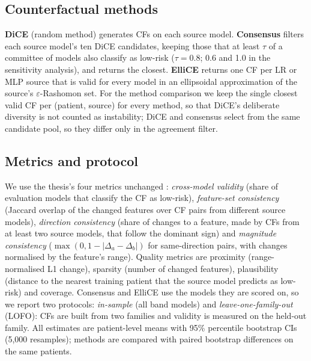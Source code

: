 \documentclass[conference]{IEEEtran}
\begin{document}
\subsection{Counterfactual methods}
\textbf{DiCE} (random method) generates CFs on each source model. \textbf{Consensus} filters each source model's ten
DiCE candidates, keeping those that at least $\tau$ of a committee of models also classify as low-risk ($\tau=0.8$;
0.6 and 1.0 in the sensitivity analysis), and returns the closest. \textbf{ElliCE} \cite{turbal2025ellice} returns one
CF per LR or MLP source that is valid for every model in an ellipsoidal approximation of the source's $\varepsilon$-Rashomon
set. For the method comparison we keep the single closest valid CF per (patient, source) for every method, so that
DiCE's deliberate diversity is not counted as instability; DiCE and consensus select from the same candidate pool, so they
differ only in the agreement filter.

\subsection{Metrics and protocol}
We use the thesis's four metrics unchanged \cite{emekci2026}: \emph{cross-model validity} (share of evaluation models
that classify the CF as low-risk), \emph{feature-set consistency} (Jaccard overlap of the changed features over CF pairs
from different source models), \emph{direction consistency} (share of changes to a feature, made by CFs from at least two
source models, that follow the dominant sign) and \emph{magnitude consistency} ($\max(0, 1-|\Delta_a-\Delta_b|)$ for
same-direction pairs, with changes normalised by the feature's range). Quality metrics are proximity (range-normalised
L1 change), sparsity (number of changed features), plausibility (distance to the nearest training patient that the source
model predicts as low-risk) and coverage. Consensus and ElliCE use the models they are scored on, so we report two
protocols: \emph{in-sample} (all band models) and \emph{leave-one-family-out} (LOFO): CFs are built from two families
and validity is measured on the held-out family. All estimates are patient-level means with 95\% percentile bootstrap
CIs (5,000 resamples); methods are compared with paired bootstrap differences on the same patients.




\end{document}
